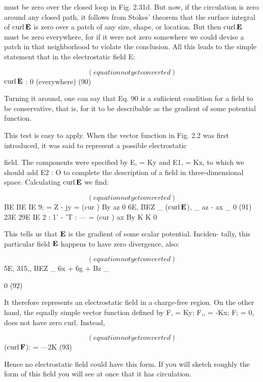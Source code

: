 must be zero over the closed loop in Fig. 2.31d. But now, if the circulation
is zero around any closed path, it follows from Stokes'
theorem that the surface integral of $\operatorname{curl}\mathbf{E}$ is zero over a patch of any
size, shape, or location. But then $\operatorname{curl}\mathbf{E}$ must be zero everywhere,
for if it were not zero somewhere we could devise a patch in that
neighborhood to violate the conclusion. All this leads to the simple
statement that in the electrostatic field E:

\begin{equation}
(equation not yet converted)
\end{equation}
$\operatorname{curl}\mathbf{E}$ : 0 (everywhere) (90)

Turning it around, one can say that Eq. 90 is a sufiicient condition for
a field to be conservative, that is, for it to be describable as the gradient
of some potential function.

This test is easy to apply. When the vector function in Fig. 2.2
was first introduced, it was said to represent a possible electrostatic

field. The components were specified by E, = Ky and E1, = Kx, to
which we should add E2 : O to complete the description of a field
in three-dimensional space. Calculating $\operatorname{curl}\mathbf{E}$ we find:

\begin{equation}
(equation not yet converted)
\end{equation}
BE BE
IE 9; = Z - jy =
(cur ) By az 0
6E, BEZ _
($\operatorname{curl}\mathbf{E}$), _ az - ax _ 0 (91)
23E 29E
IE 2 : 1' - 'T : --- =
(cur ) ax By K K 0

This tells us that $\mathbf{E}$ is the gradient of some scalar potential. Inciden-
tally, this particular field $\mathbf{E}$ happens to have zero divergence, also:

\begin{equation}
(equation not yet converted)
\end{equation}
5E, 315,, BEZ _
6x + 6g + Bz _

0 (92)

It therefore represents an electrostatic field in a charge-free region.
On the other hand, the equally simple vector function defined by
F, = Ky; F,, = -Kx; F; = 0, does not have zero curl. Instead,

\begin{equation}
(equation not yet converted)
\end{equation}
($\operatorname{curl}\mathbf{F}$): = ---2K (93)

Hence no electrostatic field could have this form. If you will sketch
roughly the form of this field you will see at once that it has
circulation.

